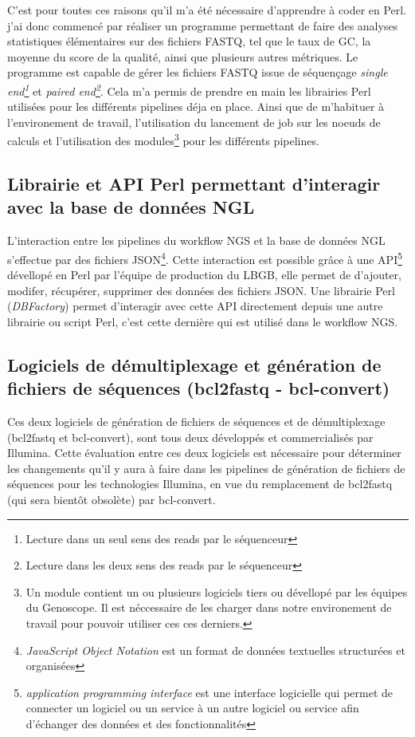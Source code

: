 C'est pour toutes ces raisons qu'il m'a été nécessaire d'apprendre à coder en Perl. j'ai donc commencé par réaliser un programme permettant de faire des analyses statistiques élémentaires sur des fichiers FASTQ, tel que le taux de GC, la moyenne du score de la qualité, ainsi que plusieurs autres métriques. Le programme est capable de gérer les fichiers FASTQ issue de séquençage \emph{single end\footnote{Lecture dans un seul sens des reads par le séquenceur}} et \emph{paired end\footnote{Lecture dans les deux sens des reads par le séquenceur}}. Cela m'a permis de prendre en main les librairies Perl utilisées pour les différents pipelines déja en place. Ainsi que de m'habituer à l'environement de travail, l'utilisation du lancement de job sur les noeuds de calculs et l'utilisation des modules\footnote{Un module contient un ou plusieurs logiciels tiers ou dévellopé par les équipes du Genoscope. Il est néccessaire de les charger dans notre environement de travail pour pouvoir utiliser ces ces derniers.} pour les différents pipelines.

\subsection{Librairie et API Perl permettant d'interagir avec la base de données NGL}
L'interaction entre les pipelines du workflow NGS et la base de données NGL s'effectue par des fichiers JSON\footnote{\emph{JavaScript Object Notation} est un format de données textuelles structurées et organisées}.
Cette interaction est possible grâce à une API\footnote{\emph{application programming interface} est une interface logicielle qui permet de \og connecter \fg{} un logiciel ou un service à un autre logiciel ou service afin d'échanger des données et des fonctionnalités} dévellopé en Perl par l'équipe de \og production\fg{} du LBGB, elle permet de d'ajouter, modifer, récupérer, supprimer des données des fichiers JSON. Une librairie Perl (\emph{DBFactory}) permet d'interagir avec cette API directement depuis une autre librairie ou script Perl, c'est cette dernière qui est utilisé dans le workflow NGS.

\subsection{Logiciels de démultiplexage et génération de fichiers de séquences (bcl2fastq - bcl-convert)}
\label{DBFactory}
Ces deux logiciels de génération de fichiers de séquences et de démultiplexage (bcl2fastq et bcl-convert), sont tous deux développés et commercialisés par Illumina. Cette évaluation entre ces deux logiciels est nécessaire pour déterminer les changements qu'il y aura à faire dans les pipelines de génération de fichiers de séquences pour les technologies Illumina, en vue du remplacement de bcl2fastq (qui sera bientôt obsolète) par bcl-convert.

